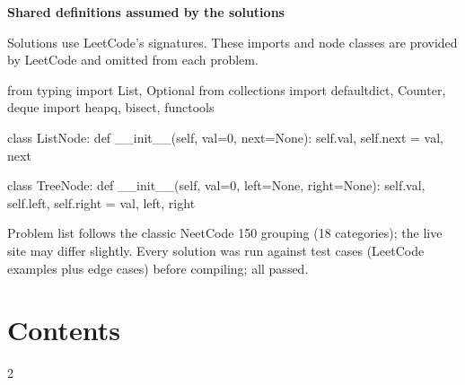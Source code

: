 \documentclass[10pt,a4paper]{article}
\begin{document}
\vspace{4pt}
{\large\bfseries Shared definitions assumed by the solutions\par}
{\small Solutions use LeetCode's signatures. These imports and node classes are provided by LeetCode and omitted from each problem.\par}
\begin{code}
from typing import List, Optional
from collections import defaultdict, Counter, deque
import heapq, bisect, functools

class ListNode:
    def __init__(self, val=0, next=None):
        self.val, self.next = val, next

class TreeNode:
    def __init__(self, val=0, left=None, right=None):
        self.val, self.left, self.right = val, left, right
\end{code}

\vspace{4pt}
{\footnotesize\color{muted} Problem list follows the classic NeetCode 150 grouping (18 categories); the live site may differ slightly. Every solution was run against test cases (LeetCode examples plus edge cases) before compiling; all passed.\par}

\newpage


\newpage
\section*{Contents}
\begin{multicols}{2}
\makeatletter{}\makeatother
\end{multicols}

\newpage

\newpage

\newpage

\newpage

\newpage

\newpage

\newpage

\newpage

\newpage

\newpage

\newpage

\newpage

\newpage

\newpage

\newpage

\newpage

\newpage

\newpage

\end{document}
